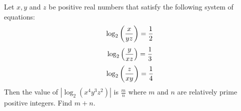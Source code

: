 Let $x,y$ and $z$ be positive real numbers that satisfy the following system of equations:
$$\log_2\left({x \over yz}\right) = {1 \over 2}$$$$\log_2\left({y \over xz}\right) = {1 \over 3}$$$$\log_2\left({z \over xy}\right) = {1 \over 4}$$
Then the value of $\left|\log_2(x^4y^3z^2)\right|$ is $\tfrac{m}{n}$ where $m$ and $n$ are relatively prime positive integers. Find $m+n$.
